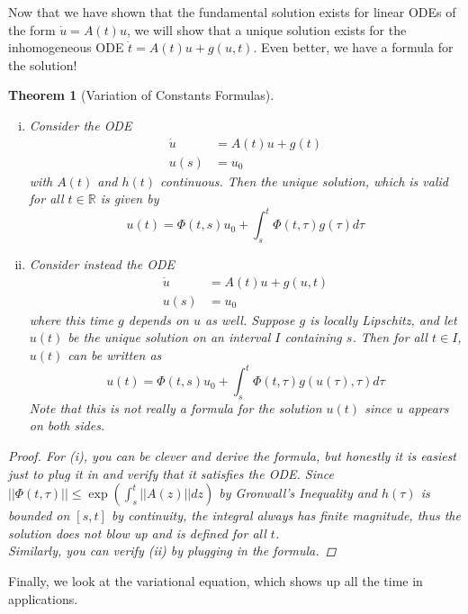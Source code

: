 \documentclass{article}
\newtheorem{theorem}{Theorem}[section]
\def\R{{\mathbb R}}
\begin{document}
Now that we have shown that the fundamental solution exists for linear ODEs of the form $\dot{u} = A(t) u$, we will show that a unique solution exists for the inhomogeneous ODE $\dot{t} = A(t)u + g(u, t)$. Even better, we have a formula for the solution!

\begin{theorem}[Variation of Constants Formulas]\label{VOC}
\begin{enumerate}[(i)]
\item Consider the ODE
\begin{align*}
\dot{u} &= A(t)u + g(t) \\
u(s) &= u_0
\end{align*}
with $A(t)$ and $h(t)$ continuous. Then the unique solution, which is valid for all $t \in \R$ is given by
\begin{equation}\label{VOC1}
u(t) = \Phi(t,s)u_0 + \int_s^t \Phi(t, \tau) g(\tau) d \tau
\end{equation}
\item Consider instead the ODE
\begin{align*}
\dot{u} &= A(t)u + g(u, t) \\
u(s) &= u_0
\end{align*}
where this time $g$ depends on $u$ as well. Suppose $g$ is locally Lipschitz, and let $u(t)$ be the unique solution on an interval $I$ containing $s$. Then for all $t \in I$, $u(t)$ can be written as
\begin{equation}\label{VOC2}
u(t) = \Phi(t,s)u_0 + \int_s^t \Phi(t, \tau) g(u(\tau), \tau) d \tau
\end{equation}
Note that this is not really a formula for the solution $u(t)$ since $u$ appears on both sides.
\end{enumerate}
\begin{proof}
For (i), you can be clever and derive the formula, but honestly it is easiest just to plug it in and verify that it satisfies the ODE. Since $||\Phi(t,\tau)|| \leq \exp\left( \int_s^t ||A(z)|| dz \right)$ by Gronwall's Inequality and $h(\tau)$ is bounded on $[s, t]$ by continuity, the integral always has finite magnitude, thus the solution does not blow up and is defined for all $t$.\\

Similarly, you can verify (ii) by plugging in the formula.
\end{proof}
\end{theorem}

Finally, we look at the variational equation, which shows up all the time in applications.
\end{document}
